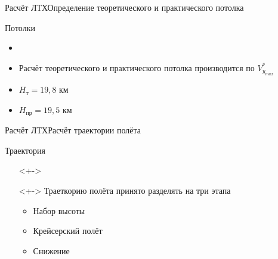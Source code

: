 \begin{frame}{Расчёт ЛТХ}{Определение теоретического и практического потолка}
    \begin{minipage}[c]{0.45\textwidth}
        \begin{block}{Потолки}
        \begin{itemize}
            \item <+-> []
            \item <+-> [] Расчёт теоретического и практического потолка производится по $V^*_{y_{max}}$
            \item <+-> [] $H_\text{т} = 19,8$ км 
            \item <+-> [] $H_\text{пр} = 19,5$ км
        \end{itemize}
        \end{block}
    \end{minipage}
    \begin{minipage}[c]{0.45\textwidth}
    \end{minipage}
\end{frame}

\begin{frame}{Расчёт ЛТХ}{Расчёт траектории полёта}
    \begin{block}{Траектория}
    \begin{itemize}
        \item [] <+->
        \item [] <+-> Траеткорию полёта принято разделять на три этапа 
            \begin{itemize}
                \item Набор высоты 
                \item Крейсерский полёт 
                \item Снижение 
            \end{itemize}
    \end{itemize}
    \end{block}
\end{frame}

